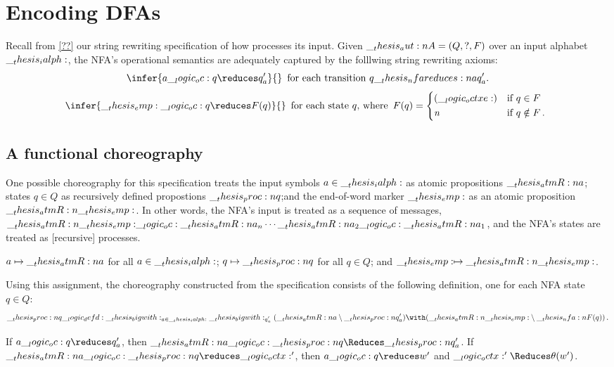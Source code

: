 \section{Encoding \aclp*{DFA}}

Recall from \cref{??} our string rewriting specification of how  processes its input.
Given  $\__thesis_aut:n {A} = (Q, ?, F)$ over an input alphabet $\__thesis_ialph:$, the \ac{NFA}'s operational semantics are adequately captured by the folllwing string rewriting axioms:
\begin{equation*}
  \infer{a \oc q \reduces q'_a}{}
  \enspace\text{for each transition $q \nfareduces[a] q'_a$.}
\end{equation*}
\begin{equation*}
  \infer{\emp \oc q \reduces F(q)}{}
  \enspace\text{for each state $q$, where}\enspace
  F(q) = \begin{cases*}
           (\octxe) & if $q \in F$ \\
           \symrej & if $q \notin F$\,.
         \end{cases*}
\end{equation*}

\subsection{A functional choreography}

One possible choreography for this specification treats the input symbols $a \in \__thesis_ialph:$ as atomic propositions $\__thesis_atmR:n {a}$; states $q \in Q$ as recursively defined propostions $\__thesis_proc:n {q}$;and the end-of-word marker $\__thesis_emp:$ as an atomic proposition $\__thesis_atmR:n {\__thesis_emp:}$.
In other words, the \ac{NFA}'s input is treated as a sequence of messages, $\__thesis_atmR:n {\__thesis_emp:} \__logic_oc: \__thesis_atmR:n {a}_n \dotsm \__thesis_atmR:n {a}_2 \__logic_oc: \__thesis_atmR:n {a}_1$, and the \ac{NFA}'s states are treated as [recursive] processes.

$a \mapsto \__thesis_atmR:n {a}$ for all $a \in \__thesis_ialph:$; $q \mapsto \__thesis_proc:n {q}$ for all $q \in Q$; and $\__thesis_emp: \mapsto \__thesis_atmR:n {\__thesis_emp:}$.

Using this assignment, the choreography constructed from the specification consists of the following definition, one for each \ac{NFA} state $q \in Q$:
\begin{equation*}
  \proc{q} \defd \bigwith_{a \in \ialph} \bigwith_{q\smash{'_a}} (\atmR{a} \limp \proc{q}'_a) \with (\atmR{\emp} \limp \nfa{F}(q))
  \,.
\end{equation*}

\begin{corollary}
  If $a \oc q \reduces q'_a$, then $\atmR{a} \oc \proc{q} \Reduces \proc{q}'_a$.
  If $\atmR{a} \oc \proc{q} \reduces \octx'$, then $a \oc q \reduces w'$ and $\octx' \Reduces \theta(w')$.
\end{corollary}

